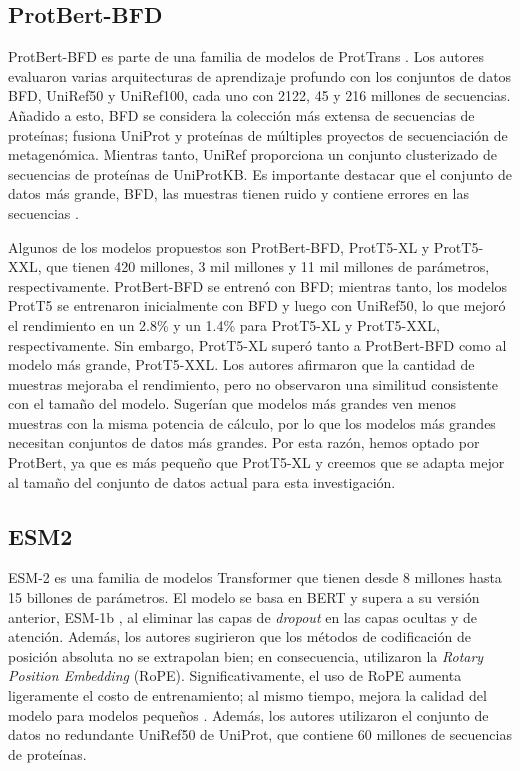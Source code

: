 \subsection{ProtBert-BFD}

ProtBert-BFD es parte de una familia de modelos de ProtTrans \citep{elnaggar2021prottrans}. Los autores evaluaron varias arquitecturas de aprendizaje profundo con los conjuntos de datos BFD, UniRef50 y UniRef100, cada uno con 2122, 45 y 216 millones de secuencias. Añadido a esto, BFD se considera la colección más extensa de secuencias de proteínas; fusiona UniProt \citep{uniprot2019uniprot} y proteínas de múltiples proyectos de secuenciación de metagenómica. Mientras tanto, UniRef \citep{suzek2015uniref} proporciona un conjunto clusterizado de secuencias de proteínas de UniProtKB. Es importante destacar que el conjunto de datos más grande, BFD, las muestras tienen ruido y contiene errores en las secuencias \citep{elnaggar2021prottrans}.

Algunos de los modelos propuestos son ProtBert-BFD, ProtT5-XL y ProtT5-XXL, que tienen 420 millones, 3 mil millones y 11 mil millones de parámetros, respectivamente. ProtBert-BFD se entrenó con BFD; mientras tanto, los modelos ProtT5 se entrenaron inicialmente con BFD y luego con UniRef50, lo que mejoró el rendimiento en un 2.8\% y un 1.4\% para ProtT5-XL y ProtT5-XXL, respectivamente. Sin embargo, ProtT5-XL superó tanto a ProtBert-BFD como al modelo más grande, ProtT5-XXL. Los autores afirmaron que la cantidad de muestras mejoraba el rendimiento, pero no observaron una similitud consistente con el tamaño del modelo. Sugerían que modelos más grandes ven menos muestras con la misma potencia de cálculo, por lo que los modelos más grandes necesitan conjuntos de datos más grandes. Por esta razón, hemos optado por ProtBert, ya que es más pequeño que ProtT5-XL y creemos que se adapta mejor al tamaño del conjunto de datos actual para esta investigación.

\subsection{ESM2}


ESM-2 \citep{lin2023evolutionary} es una familia de modelos Transformer que tienen  desde 8 millones hasta 15 billones de parámetros. El modelo se basa en BERT \citep{devlin2018bert} y supera a su versión anterior, ESM-1b \citep{rives2021biological}, al eliminar las capas de \textit{dropout} en las capas ocultas y de atención. Además, los autores sugirieron que los métodos de codificación de posición absoluta no se extrapolan bien; en consecuencia, utilizaron la \textit{Rotary Position Embedding} (RoPE). Significativamente, el uso de RoPE aumenta ligeramente el costo de entrenamiento; al mismo tiempo, mejora la calidad del modelo para modelos pequeños \citep{lin2023evolutionary}. Además, los autores utilizaron el conjunto de datos no redundante UniRef50 \citep{suzek2015uniref} de UniProt, que contiene 60 millones de secuencias de proteínas.


